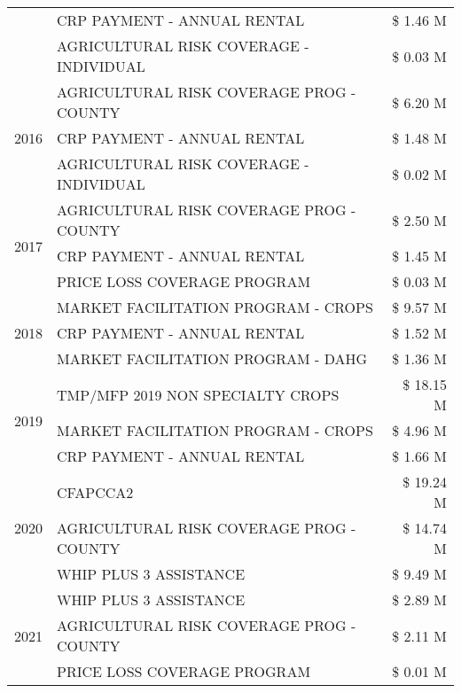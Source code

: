 \begin{tabular}{llr}
 & CRP PAYMENT - ANNUAL RENTAL & \$ 1.46 M \\
 & AGRICULTURAL RISK COVERAGE - INDIVIDUAL & \$ 0.03 M \\
\cline{1-3}
\multirow[t]{3}{*}{2016} & AGRICULTURAL RISK COVERAGE PROG - COUNTY & \$ 6.20 M \\
 & CRP PAYMENT - ANNUAL RENTAL & \$ 1.48 M \\
 & AGRICULTURAL RISK COVERAGE - INDIVIDUAL & \$ 0.02 M \\
\cline{1-3}
\multirow[t]{3}{*}{2017} & AGRICULTURAL RISK COVERAGE PROG - COUNTY & \$ 2.50 M \\
 & CRP PAYMENT - ANNUAL RENTAL & \$ 1.45 M \\
 & PRICE LOSS COVERAGE PROGRAM & \$ 0.03 M \\
\cline{1-3}
\multirow[t]{3}{*}{2018} & MARKET FACILITATION PROGRAM - CROPS & \$ 9.57 M \\
 & CRP PAYMENT - ANNUAL RENTAL & \$ 1.52 M \\
 & MARKET FACILITATION PROGRAM - DAHG & \$ 1.36 M \\
\cline{1-3}
\multirow[t]{3}{*}{2019} & TMP/MFP 2019 NON SPECIALTY CROPS & \$ 18.15 M \\
 & MARKET FACILITATION PROGRAM - CROPS & \$ 4.96 M \\
 & CRP PAYMENT - ANNUAL RENTAL & \$ 1.66 M \\
\cline{1-3}
\multirow[t]{3}{*}{2020} & CFAPCCA2 & \$ 19.24 M \\
 & AGRICULTURAL RISK COVERAGE PROG - COUNTY & \$ 14.74 M \\
 & WHIP PLUS 3 ASSISTANCE & \$ 9.49 M \\
\cline{1-3}
\multirow[t]{3}{*}{2021} & WHIP PLUS 3 ASSISTANCE & \$ 2.89 M \\
 & AGRICULTURAL RISK COVERAGE PROG - COUNTY & \$ 2.11 M \\
 & PRICE LOSS COVERAGE PROGRAM & \$ 0.01 M \\
\cline{1-3}
\bottomrule
\end{tabular}
